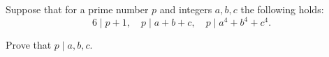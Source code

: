 Suppose that for a prime number $p$ and integers $a,b,c$ the following holds:\[6\mid p+1,\quad p\mid a+b+c,\quad p\mid a^4+b^4+c^4.\]

Prove that $p\mid a,b,c$.